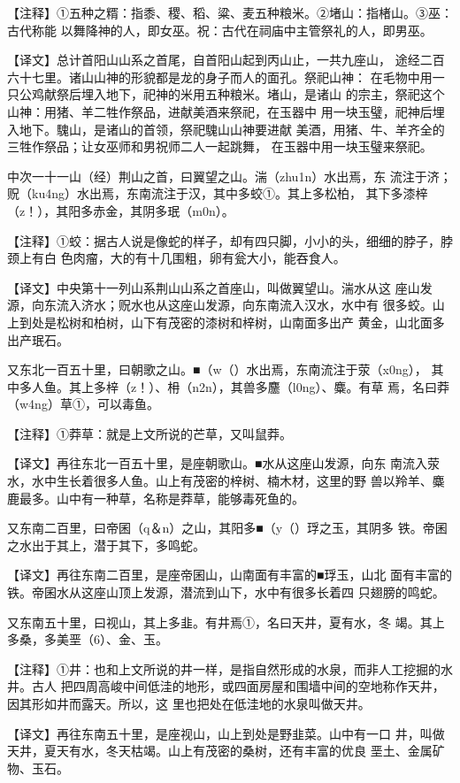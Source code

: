 \documentclass[a4paper,12pt,UTF8,twoside]{ctexbook}
\begin{document}
【注释】①五种之糈：指黍、稷、稻、粱、麦五种粮米。②堵山：指楮山。③巫：古代称能 以舞降神的人，即女巫。祝：古代在祠庙中主管祭礼的人，即男巫。

【译文】总计首阳山山系之首尾，自首阳山起到丙山止，一共九座山， 途经二百六十七里。诸山山神的形貌都是龙的身子而人的面孔。祭祀山神： 在毛物中用一只公鸡献祭后埋入地下，祀神的米用五种粮米。堵山，是诸山 的宗主，祭祀这个山神：用猪、羊二牲作祭品，进献美酒来祭祀，在玉器中 用一块玉璧，祀神后埋入地下。騩山，是诸山的首领，祭祀騩山山神要进献 美酒，用猪、牛、羊齐全的三牲作祭品；让女巫师和男祝师二人一起跳舞， 在玉器中用一块玉璧来祭祀。

中次一十一山（经）荆山之首，曰翼望之山。湍（zhu1n）水出焉，东 流注于济；贶（ku4ng）水出焉，东南流注于汉，其中多蛟①。其上多松柏， 其下多漆梓（z！），其阳多赤金，其阴多珉（m0n）。

【注释】①蛟：据古人说是像蛇的样子，却有四只脚，小小的头，细细的脖子，脖颈上有白 色肉瘤，大的有十几围粗，卵有瓮大小，能吞食人。

【译文】中央第十一列山系荆山山系之首座山，叫做翼望山。湍水从这 座山发源，向东流入济水；贶水也从这座山发源，向东南流入汉水，水中有 很多蛟。山上到处是松树和柏树，山下有茂密的漆树和梓树，山南面多出产 黄金，山北面多出产珉石。

又东北一百五十里，曰朝歌之山。■（w（）水出焉，东南流注于荥（x0ng）， 其中多人鱼。其上多梓（z！）、枏（n2n），其兽多麢（l0ng）、麋。有草 焉，名曰莽（w4ng）草①，可以毒鱼。

【注释】①莽草：就是上文所说的芒草，又叫鼠莽。

【译文】再往东北一百五十里，是座朝歌山。■水从这座山发源，向东 南流入荥水，水中生长着很多人鱼。山上有茂密的梓树、楠木材，这里的野 兽以羚羊、麋鹿最多。山中有一种草，名称是莽草，能够毒死鱼的。

又东南二百里，曰帝囷（q＆n）之山，其阳多■（y（）琈之玉，其阴多 铁。帝囷之水出于其上，潜于其下，多鸣蛇。

【译文】再往东南二百里，是座帝囷山，山南面有丰富的■琈玉，山北 面有丰富的铁。帝囷水从这座山顶上发源，潜流到山下，水中有很多长着四 只翅膀的鸣蛇。

又东南五十里，曰视山，其上多韭。有井焉①，名曰天井，夏有水，冬 竭。其上多桑，多美垩（6）、金、玉。

【注释】①井：也和上文所说的井一样，是指自然形成的水泉，而非人工挖掘的水井。古人 把四周高峻中间低洼的地形，或四面房屋和围墙中间的空地称作天井，因其形如井而露天。所以，这 里也把处在低洼地的水泉叫做天井。

【译文】再往东南五十里，是座视山，山上到处是野韭菜。山中有一口 井，叫做天井，夏天有水，冬天枯竭。山上有茂密的桑树，还有丰富的优良 垩土、金属矿物、玉石。
\end{document}
